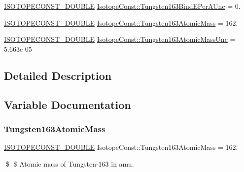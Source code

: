 \begin{DoxyCompactItemize}
\mbox{\hyperlink{group___isotope_const-_macros_ga8f45a7272ce02c0b4c65c44636ed719a}{I\+S\+O\+T\+O\+P\+E\+C\+O\+N\+S\+T\+\_\+\+D\+O\+U\+B\+LE}} \mbox{\hyperlink{group___isotope_const-_tungsten-_w163_gaadbd3b06be970e24cac27060ab5fe590}{Isotope\+Const\+::\+Tungsten163\+Bind\+E\+Per\+A\+Unc}} = 0.
\item 
\mbox{\hyperlink{group___isotope_const-_macros_ga8f45a7272ce02c0b4c65c44636ed719a}{I\+S\+O\+T\+O\+P\+E\+C\+O\+N\+S\+T\+\_\+\+D\+O\+U\+B\+LE}} \mbox{\hyperlink{group___isotope_const-_tungsten-_w163_ga706d808f9a771230ac9281135a55f4a4}{Isotope\+Const\+::\+Tungsten163\+Atomic\+Mass}} = 162.
\item 
\mbox{\hyperlink{group___isotope_const-_macros_ga8f45a7272ce02c0b4c65c44636ed719a}{I\+S\+O\+T\+O\+P\+E\+C\+O\+N\+S\+T\+\_\+\+D\+O\+U\+B\+LE}} \mbox{\hyperlink{group___isotope_const-_tungsten-_w163_ga12262d95dea681be2f81f2f5a8d1336b}{Isotope\+Const\+::\+Tungsten163\+Atomic\+Mass\+Unc}} = 5.\+663e-\/05
\end{DoxyCompactItemize}


\subsection{Detailed Description}


\subsection{Variable Documentation}
\mbox{\label{group___isotope_const-_tungsten-_w163_ga706d808f9a771230ac9281135a55f4a4}} 
\subsubsection{\texorpdfstring{Tungsten163\+Atomic\+Mass}{Tungsten163AtomicMass}}
{\footnotesize\ttfamily \mbox{\hyperlink{group___isotope_const-_macros_ga8f45a7272ce02c0b4c65c44636ed719a}{I\+S\+O\+T\+O\+P\+E\+C\+O\+N\+S\+T\+\_\+\+D\+O\+U\+B\+LE}} Isotope\+Const\+::\+Tungsten163\+Atomic\+Mass = 162.}

\$ \$ Atomic mass of Tungsten-\/163 in amu. \mbox{\label{group___isotope_const-_tungsten-_w163_ga12262d95dea681be2f81f2f5a8d1336b}} 
